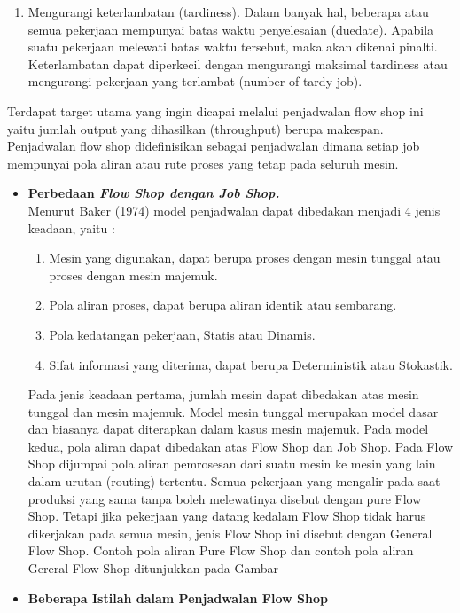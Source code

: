 \documentclass[a4paper,twoside]{article}
\begin{document}
\begin{enumerate}
\begin{itemize}
\begin{enumerate}
		\item Mengurangi keterlambatan (tardiness). Dalam banyak hal, beberapa atau semua pekerjaan mempunyai batas waktu penyelesaian (duedate). Apabila suatu pekerjaan melewati batas waktu tersebut, maka akan dikenai pinalti. Keterlambatan dapat diperkecil dengan mengurangi maksimal tardiness atau mengurangi pekerjaan yang terlambat (number of  tardy job).
		\end{enumerate}
		Terdapat target utama yang ingin dicapai melalui penjadwalan flow shop ini yaitu jumlah output yang dihasilkan (throughput) berupa makespan. Penjadwalan flow shop didefinisikan sebagai penjadwalan dimana setiap job mempunyai pola aliran atau rute proses yang tetap pada seluruh mesin.
		\end{itemize}
		
		\begin{itemize}
		\item{\bf Perbedaan \it{Flow Shop} dengan \it{Job Shop}.}\\
		Menurut Baker (1974) model penjadwalan dapat dibedakan menjadi 4 jenis keadaan, yaitu :
		\begin{enumerate}
		\item Mesin yang digunakan, dapat berupa proses dengan mesin tunggal atau proses dengan mesin majemuk.
		\item Pola aliran proses, dapat berupa aliran identik atau sembarang.
		\item Pola kedatangan pekerjaan, Statis atau Dinamis.
		\item Sifat informasi yang diterima, dapat berupa Deterministik atau Stokastik.
		\end{enumerate}
		Pada jenis keadaan pertama, jumlah mesin dapat dibedakan atas mesin tunggal dan mesin majemuk. Model mesin tunggal merupakan model dasar dan biasanya dapat diterapkan dalam kasus mesin majemuk.
Pada model kedua, pola aliran dapat dibedakan atas Flow Shop dan Job Shop. Pada Flow Shop dijumpai pola aliran pemrosesan dari suatu mesin ke mesin yang lain dalam urutan (routing) tertentu. Semua pekerjaan yang mengalir pada saat produksi yang sama tanpa boleh melewatinya disebut dengan pure Flow Shop. Tetapi jika pekerjaan yang datang kedalam Flow Shop tidak harus dikerjakan pada semua mesin, jenis Flow Shop ini disebut dengan General Flow Shop. Contoh pola aliran Pure Flow Shop dan contoh pola aliran Gereral Flow Shop ditunjukkan pada Gambar 
		\end{itemize}		
		
		\begin{itemize}
		\item{\bf Beberapa Istilah dalam Penjadwalan Flow Shop}
		

\end{itemize}
\end{enumerate}
\end{document}
